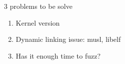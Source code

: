 \documentclass{beamer}
\begin{document}
\begin{CJK*}{UTF8}{bsmi}
  \begin{frame}{3 problems to be solve}
    \begin{enumerate}
      \item Kernel version
      \item Dynamic linking issue: musl, libelf
      \item Has it enough time to fuzz?
    \end{enumerate}
  \end{frame}

\end{CJK*}
\end{document}

